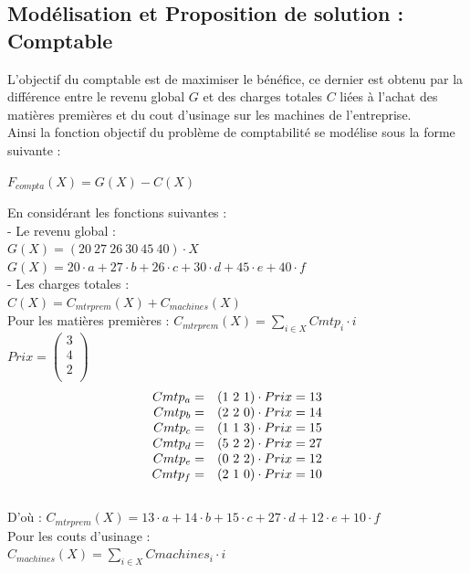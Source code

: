 \documentclass[a4paper, 11pt]{article}
\begin{document}
\subsection{Modélisation et Proposition de solution : Comptable}
L'objectif du comptable est de maximiser le bénéfice, ce dernier est obtenu par la différence entre le revenu global $G$ et des charges totales $C$  liées à l'achat des matières premières et du cout d'usinage sur les machines de l'entreprise.\\
Ainsi la fonction objectif du problème de comptabilité se modélise sous la forme suivante :
\begin{center}
$F_{compta} (X) = G(X) - C(X)$ \\
\end{center}
En considérant les fonctions suivantes : \\
- Le revenu global :\\
$G(X) = (20~27~26~30~45~40)\cdot X $ \\
$G(X) =  20\cdot a + 27\cdot b + 26\cdot c + 30\cdot d + 45\cdot e + 40\cdot f $ \\
- Les charges totales :\\
$C(X) = C_{mtrprem}(X) + C_{machines}(X) $ \\ 
Pour les matières premières :
$C_{mtrprem}(X) = \sum_{i\in{X}}{Cmtp_i\cdot i} $ \\
$Prix = \begin{pmatrix}
        3\\
        4\\
        2\\
    \end{pmatrix}$
$$
\begin{array}{r l}
    Cmtp_a = & (1~2~1)\cdot Prix = 13 \\
    Cmtp_b = & (2~2~0)\cdot Prix = 14 \\
    Cmtp_c = & (1~1~3)\cdot Prix = 15 \\
    Cmtp_d = & (5~2~2)\cdot Prix = 27 \\
    Cmtp_e = & (0~2~2)\cdot Prix = 12 \\
    Cmtp_f = & (2~1~0)\cdot Prix = 10 \\
\end{array}
$$
\\
D'où : $C_{mtrprem}(X) = 13\cdot a + 14\cdot b + 15\cdot c + 27\cdot d + 12\cdot e + 10\cdot f  $ \\
Pour les couts d'usinage :\\
$C_{machines}(X) = \sum_{i\in{X}}{Cmachines_i\cdot i} $ \\
\end{document}
